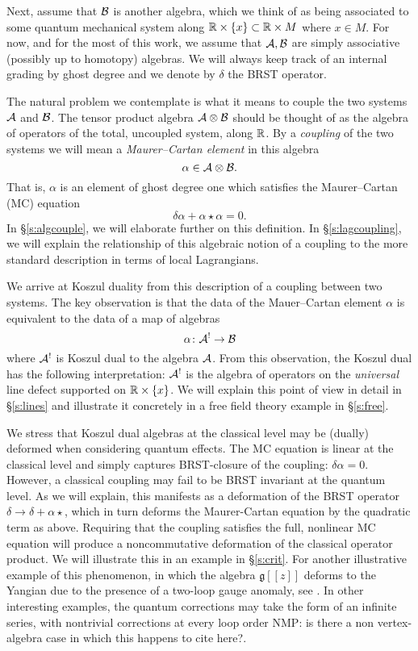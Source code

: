 \documentclass[11pt]{amsart}
\def\natalie#1{{\textcolor{green!65!black}{NMP: {#1}}}}
\begin{document}
Next, assume that $\mathcal B$ is another algebra, which we think of as being associated to some quantum mechanical system along $\mathbb R \times \{x\} \subset \mathbb R \times M$ where $x \in M$. 
For now, and for the most of this work, we assume that $\mathcal A,\mathcal B$ are simply associative (possibly up to homotopy) algebras. 
We will always keep track of an internal grading by ghost degree and we denote by $\delta$ the BRST operator. 

The natural problem we contemplate is what it means to couple the two systems $\mathcal A$ and $\mathcal B$. 
The tensor product algebra $\mathcal A \otimes \mathcal B$ should be thought of as the algebra of operators of the total, uncoupled system, along $\mathbb R$. 
By a {\em coupling} of the two systems we will mean a {\em Maurer--Cartan element} in this algebra
\[
\alpha \in \mathcal A \otimes \mathcal B .
\]
That is, $\alpha$ is an element of ghost degree one which satisfies the Maurer--Cartan (MC) equation
\[
\delta \alpha + \alpha \star \alpha = 0 .
\]
In \S \ref{s:algcouple}, we will elaborate further on this definition. 
In \S \ref{s:lagcoupling}, we will explain the relationship of this algebraic notion of a coupling to the more standard description in terms of local Lagrangians.

We arrive at Koszul duality from this description of a coupling between two systems. 
The key observation is that the data of the Mauer--Cartan element $\alpha$ is equivalent to the data of a map of algebras
\[
\alpha \colon \mathcal A^! \to \mathcal B 
\]
where $\mathcal A^!$ is Koszul dual to the algebra $\mathcal A$. 
From this observation, the Koszul dual has the following interpretation: $\mathcal A^!$ is the algebra of operators on the {\em universal} line defect supported on $\mathbb R \times \{x\}$. We will explain this point of view in detail in \S \ref{s:lines} and illustrate it concretely in a free field theory example in \S \ref{s:free}. 

We stress that Koszul dual algebras at the classical level may be (dually) deformed when considering quantum effects. The MC equation is linear at the classical level and simply captures BRST-closure of the coupling: $\delta \alpha = 0$. However, a classical coupling may fail to be BRST invariant at the quantum level. As we will explain, this manifests as a deformation of the BRST operator $\delta \rightarrow \delta + \alpha \star$, which in turn deforms the Maurer-Cartan equation by the quadratic term as above. Requiring that the coupling satisfies the full, nonlinear MC equation will produce a noncommutative deformation of the classical operator product. We will illustrate this in an example in \S \ref{s:crit}. For another illustrative example of this phenomenon, in which the algebra $\mathfrak{g}[[z]]$ deforms to the Yangian due to the presence of a two-loop gauge anomaly, see \cite{CWY}. In other interesting examples, the quantum corrections may take the form of an infinite series, with nontrivial corrections at every loop order \natalie{is there a non vertex-algebra case in which this happens to cite here?}. 
\end{document}
